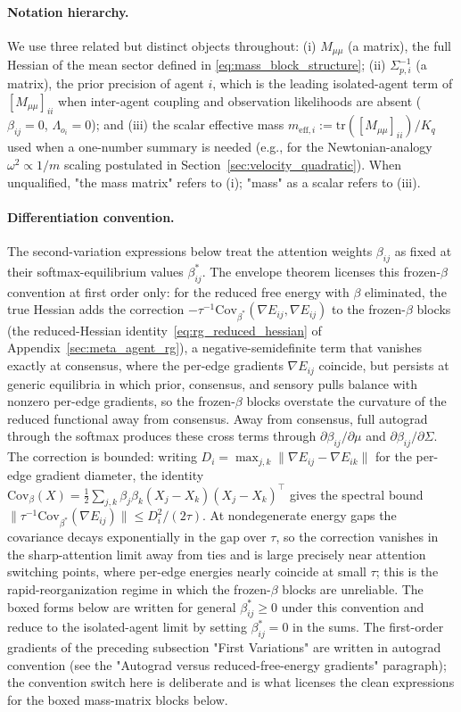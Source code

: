 \documentclass[11pt]{article}
\begin{document}
\paragraph{Notation hierarchy.}
We use three related but distinct objects throughout: (i) $M_{\mu\mu}$ (a matrix), the full Hessian of the mean sector defined in \eqref{eq:mass_block_structure}; (ii) $\Sigma_{p,i}^{-1}$ (a matrix), the prior precision of agent $i$, which is the leading isolated-agent term of $[M_{\mu\mu}]_{ii}$ when inter-agent coupling and observation likelihoods are absent ($\beta_{ij}=0$, $\Lambda_{o_i}=0$); and (iii) the scalar effective mass $m_{\text{eff},i} := \mathrm{tr}([M_{\mu\mu}]_{ii})/K_q$ used when a one-number summary is needed (e.g., for the Newtonian-analogy $\omega^2 \propto 1/m$ scaling postulated in Section~\ref{sec:velocity_quadratic}). When unqualified, "the mass matrix" refers to (i); "mass" as a scalar refers to (iii).

\paragraph{Differentiation convention.}
The second-variation expressions below treat the attention weights $\beta_{ij}$ as fixed at their softmax-equilibrium values $\beta_{ij}^*$. The envelope theorem licenses this frozen-$\beta$ convention at first order only: for the reduced free energy with $\beta$ eliminated, the true Hessian adds the correction $-\tau^{-1}\mathrm{Cov}_{\beta^*}(\nabla E_{ij}, \nabla E_{ij})$ to the frozen-$\beta$ blocks (the reduced-Hessian identity~\eqref{eq:rg_reduced_hessian} of Appendix~\ref{sec:meta_agent_rg}), a negative-semidefinite term that vanishes exactly at consensus, where the per-edge gradients $\nabla E_{ij}$ coincide, but persists at generic equilibria in which prior, consensus, and sensory pulls balance with nonzero per-edge gradients, so the frozen-$\beta$ blocks overstate the curvature of the reduced functional away from consensus. Away from consensus, full autograd through the softmax produces these cross terms through $\partial \beta_{ij}/\partial \mu$ and $\partial \beta_{ij}/\partial \Sigma$. The correction is bounded: writing $D_i = \max_{j,k}\|\nabla E_{ij} - \nabla E_{ik}\|$ for the per-edge gradient diameter, the identity $\mathrm{Cov}_\beta(X) = \tfrac{1}{2}\sum_{j,k}\beta_j\beta_k(X_j - X_k)(X_j - X_k)^\top$ gives the spectral bound $\|\tau^{-1}\mathrm{Cov}_{\beta^*}(\nabla E_{ij})\| \le D_i^2/(2\tau)$. At nondegenerate energy gaps the covariance decays exponentially in the gap over $\tau$, so the correction vanishes in the sharp-attention limit away from ties and is large precisely near attention switching points, where per-edge energies nearly coincide at small $\tau$; this is the rapid-reorganization regime in which the frozen-$\beta$ blocks are unreliable. The boxed forms below are written for general $\beta_{ij}^* \geq 0$ under this convention and reduce to the isolated-agent limit by setting $\beta_{ij}^* = 0$ in the sums. The first-order gradients of the preceding subsection "First Variations" are written in autograd convention (see the "Autograd versus reduced-free-energy gradients" paragraph); the convention switch here is deliberate and is what licenses the clean expressions for the boxed mass-matrix blocks below.
\end{document}
